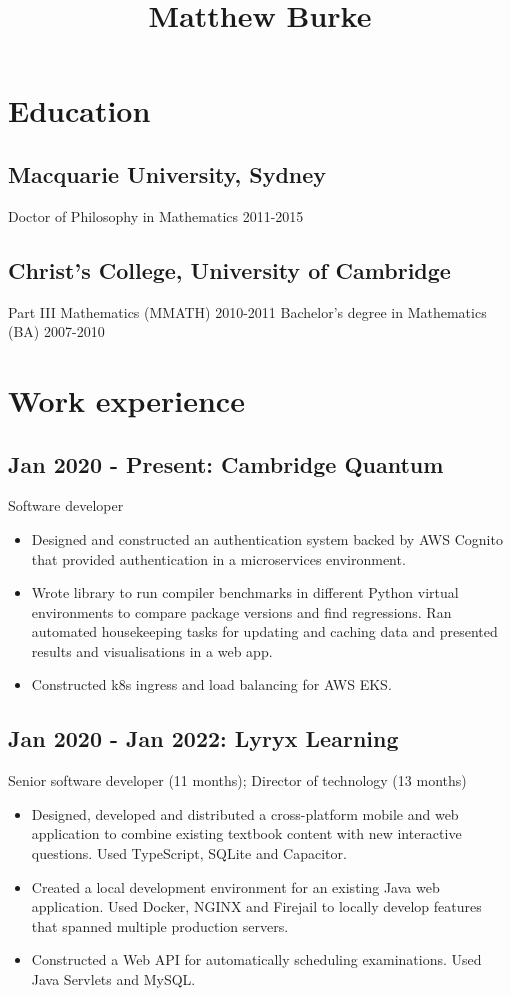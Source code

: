 \title{Matthew Burke}

\maketitle
\section*{Education}
\subsection*{Macquarie University, Sydney}
Doctor of Philosophy in Mathematics 2011-2015
\subsection*{Christ's College, University of Cambridge}
Part III Mathematics (MMATH) 2010-2011
Bachelor's degree in Mathematics (BA) 2007-2010 
\section*{Work experience}
\subsection*{Jan 2020 - Present: Cambridge Quantum}
Software developer
\begin{itemize}
\item Designed and constructed an authentication system backed by AWS Cognito that provided authentication in a microservices environment.
\item Wrote library to run compiler benchmarks in different Python virtual environments to compare package versions and find regressions.
Ran automated housekeeping tasks for updating and caching data and presented results and visualisations in a web app.
\item Constructed k8s ingress and load balancing for AWS EKS.\end{itemize}
\subsection*{Jan 2020 - Jan 2022: Lyryx Learning}
Senior software developer (11 months); Director of technology (13 months)
\begin{itemize}
\item Designed, developed and distributed a cross-platform mobile and web application to combine existing textbook content with new interactive questions. Used TypeScript, SQLite and Capacitor.
\item Created a local development environment for an existing Java web application. Used Docker, NGINX and Firejail to locally develop features that spanned multiple production servers.
\item Constructed a Web API for automatically scheduling examinations. Used Java Servlets and MySQL.
\end{itemize}
